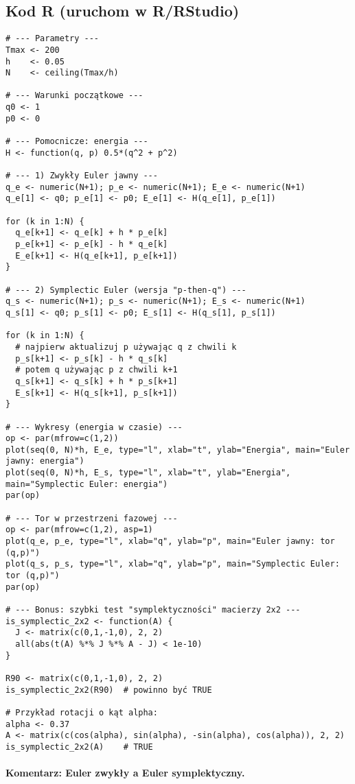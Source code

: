 \documentclass[12pt]{article}
\begin{document}
\subsection*{Kod R (uruchom w R/RStudio)}
\begin{lstlisting}
# --- Parametry ---
Tmax <- 200
h    <- 0.05
N    <- ceiling(Tmax/h)

# --- Warunki początkowe ---
q0 <- 1
p0 <- 0

# --- Pomocnicze: energia ---
H <- function(q, p) 0.5*(q^2 + p^2)

# --- 1) Zwykły Euler jawny ---
q_e <- numeric(N+1); p_e <- numeric(N+1); E_e <- numeric(N+1)
q_e[1] <- q0; p_e[1] <- p0; E_e[1] <- H(q_e[1], p_e[1])

for (k in 1:N) {
  q_e[k+1] <- q_e[k] + h * p_e[k]
  p_e[k+1] <- p_e[k] - h * q_e[k]
  E_e[k+1] <- H(q_e[k+1], p_e[k+1])
}

# --- 2) Symplectic Euler (wersja "p-then-q") ---
q_s <- numeric(N+1); p_s <- numeric(N+1); E_s <- numeric(N+1)
q_s[1] <- q0; p_s[1] <- p0; E_s[1] <- H(q_s[1], p_s[1])

for (k in 1:N) {
  # najpierw aktualizuj p używając q z chwili k
  p_s[k+1] <- p_s[k] - h * q_s[k]
  # potem q używając p z chwili k+1
  q_s[k+1] <- q_s[k] + h * p_s[k+1]
  E_s[k+1] <- H(q_s[k+1], p_s[k+1])
}

# --- Wykresy (energia w czasie) ---
op <- par(mfrow=c(1,2))
plot(seq(0, N)*h, E_e, type="l", xlab="t", ylab="Energia", main="Euler jawny: energia")
plot(seq(0, N)*h, E_s, type="l", xlab="t", ylab="Energia", main="Symplectic Euler: energia")
par(op)

# --- Tor w przestrzeni fazowej ---
op <- par(mfrow=c(1,2), asp=1)
plot(q_e, p_e, type="l", xlab="q", ylab="p", main="Euler jawny: tor (q,p)")
plot(q_s, p_s, type="l", xlab="q", ylab="p", main="Symplectic Euler: tor (q,p)")
par(op)

# --- Bonus: szybki test "symplektyczności" macierzy 2x2 ---
is_symplectic_2x2 <- function(A) {
  J <- matrix(c(0,1,-1,0), 2, 2)
  all(abs(t(A) %*% J %*% A - J) < 1e-10)
}

R90 <- matrix(c(0,1,-1,0), 2, 2)
is_symplectic_2x2(R90)  # powinno być TRUE

# Przykład rotacji o kąt alpha:
alpha <- 0.37
A <- matrix(c(cos(alpha), sin(alpha), -sin(alpha), cos(alpha)), 2, 2)
is_symplectic_2x2(A)    # TRUE
\end{lstlisting}

\paragraph{Komentarz: Euler zwykły a Euler symplektyczny.}
\end{document}
